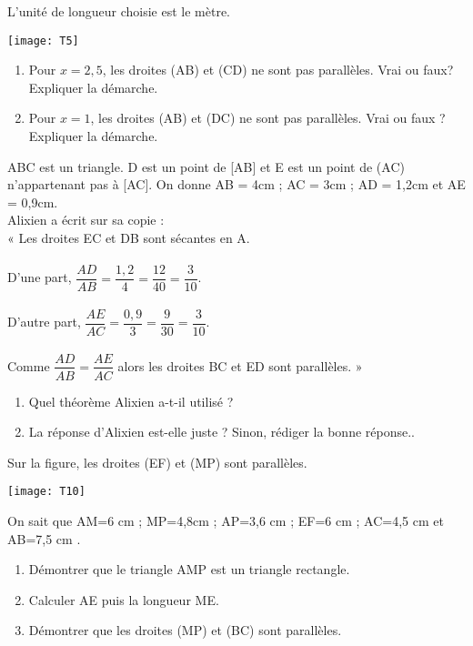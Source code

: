 \begin{exercice}
L'unité de longueur choisie est le mètre. 
\begin{center}
\texttt{[image: T5]}
\end{center}

\begin{enumerate}
\item Pour $x = 2,5$, les droites (AB) et (CD) ne sont pas parallèles. 
Vrai ou faux? Expliquer la démarche.
\item Pour $x = 1$, les droites (AB) et (DC) ne sont pas parallèles. Vrai ou faux ? Expliquer la démarche.
\end{enumerate}
\end{exercice}

\begin{exercice}
ABC est un triangle. D est un point de [AB] et E est un point de (AC) n'appartenant pas à [AC]. On donne AB = 4cm ; AC = 3cm ; AD = 1,2cm et AE = 0,9cm.\\
Alixien a écrit sur sa copie :\\
« Les droites EC et DB sont sécantes en A.\\\\
 D'une part, $\dfrac{AD}{AB}=\dfrac{1,2}{4}=\dfrac{12}{40}=\dfrac{3}{10}$.\\\\
D'autre part, $\dfrac{AE}{AC}=\dfrac{0,9}{3}=\dfrac{9}{30}=\dfrac{3}{10}$.\\\\
Comme $\dfrac{AD}{AB}=\dfrac{AE}{AC}$ alors les droites BC et ED sont parallèles. » 

\begin{enumerate}
\item Quel théorème Alixien a-t-il utilisé ?
\item La réponse d'Alixien est-elle juste ? Sinon, rédiger la bonne réponse..
\end{enumerate}
\end{exercice}

\newpage



\begin{exercice}
Sur la figure, les droites (EF) et (MP) sont parallèles.
\begin{center}
\texttt{[image: T10]}
\end{center}

On sait que AM=6 cm ; MP=4,8cm ; AP=3,6 cm ; EF=6 cm ; AC=4,5 cm et AB=7,5 cm .

\begin{enumerate}
\item Démontrer que le triangle AMP est un triangle rectangle.
\item Calculer AE puis la longueur ME.
\item Démontrer que les droites (MP) et (BC) sont parallèles.
\end{enumerate}
\end{exercice}


